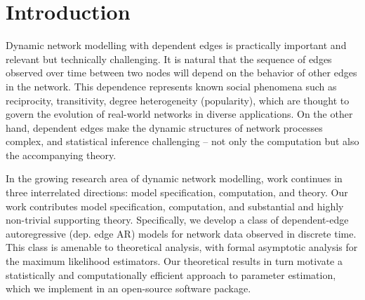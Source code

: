 \documentclass[12pt]{article}
\newcommand{\0}{{\bf 0}}
\begin{document}

\renewcommand{\theequation}{\arabic{equation}}
\section{Introduction}
\label{sec.intro}

Dynamic network modelling with dependent edges is  practically important and relevant but technically challenging.
It is natural that the sequence of edges observed over time between two nodes will depend on the behavior of other edges in the network. This dependence represents known social phenomena such as reciprocity, transitivity, degree heterogeneity (popularity), which are thought to govern the evolution of real-world networks in diverse applications.
On the other hand, dependent edges make the dynamic structures of network processes complex, and statistical inference challenging -- not only the computation but also the accompanying theory.

In the growing research area of dynamic network modelling, work continues in three interrelated directions: model specification, computation, and theory. 
Our work contributes model specification, computation, and substantial and highly non-trivial supporting theory.
Specifically, we develop a class of dependent-edge autoregressive (dep. edge AR) models for network data observed in discrete time. This class is amenable to theoretical analysis, with formal asymptotic analysis for the maximum likelihood estimators.
Our theoretical results in turn motivate a statistically and computationally efficient approach to parameter estimation, which we implement in an open-source software package.
\end{document}
